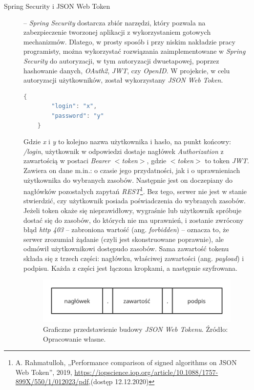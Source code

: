 \documentclass[twoside]{projektInzynierskiMS}
\numberwithin{figure}{section}
\begin{document}
\begin{description}
    \item[Spring Security i JSON Web Token] – \textit{Spring Security} dostarcza zbiór narzędzi, który pozwala na zabezpieczenie tworzonej aplikacji z wykorzystaniem gotowych mechanizmów. Dlatego, w prosty sposób i przy niskim nakładzie pracy programisty, można wykorzystać rozwiązania zaimplementowane w \textit{Spring Security} do autoryzacji, w tym autoryzacji dwuetapowej, poprzez hashowanie danych, \textit{OAuth2}, \textit{JWT}, czy \textit{OpenID}.\newline
    W projekcie, w celu autoryzacji użytkowników, został wykorzystany \textit{JSON Web Token}.
    \begin{lstlisting}[language=Java,caption=Przykład danych w formacie JSON wysyłane przy logowaniu. Źródło: Opracowanie własne.,captionpos=b]
    {
        "login": "x",
        "password": "y"
    }
    \end{lstlisting}
    Gdzie \textit{x} i \textit{y} to kolejno nazwa użytkownika i hasło, na punkt końcowy: \textit{/login}, użytkownik w odpowiedzi dostaje nagłówek \textit{Authorization} z zawartością w postaci \textit{Bearer $<$token$>$}, gdzie \textit{$<$token$>$} to token \textit{JWT}. Zawiera on dane m.in.: o czasie jego przydatności, jak i o uprawnieniach użytkownika do wybranych zasobów. Następnie jest on doczepiany do nagłówków pozostałych zapytań \textit{REST}\footnote{A. Rahmatulloh, „Performance comparison of signed algorithms on JSON Web Token”, 2019,  \newline \url{https://iopscience.iop.org/article/10.1088/1757-899X/550/1/012023/pdf},\newline (dostęp 12.12.2020)}. Bez tego, serwer nie jest w stanie stwierdzić, czy użytkownik posiada poświadczenia do wybranych zasobów. Jeżeli token okaże się nieprawidłowy, wygraśnie lub użytkownik spróbuje dostać się do zasobów, do których nie ma uprawnień, i zostanie zwrócony błąd \textit{http 403} – zabroniona wartość (ang. \textit{forbidden}) – oznacza to, że serwer zrozumiał żądanie (czyli jest skonstruowane poprawnie), ale odmówił użytkownikowi dostępu\linebreak do zasobów.
    Sama zawartość tokenu składa się z trzech części: nagłówku, właściwej zawartości (ang. \textit{payload}) i podpisu. Każda z części jest łączona kropkami, a następnie szyfrowana. 
    
    \begin{figure}[h!]
        \centering
        \includegraphics[width=\textwidth]{images/jwt.png}
        \caption{Graficzne przedstawienie budowy \textit{JSON Web Tokenu}. Źródło: Opracowanie własne.}
        \label{fig:jwt}
    \end{figure}
    

\end{description}
\end{document}
